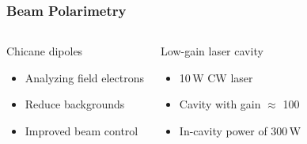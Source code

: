 \begin{frame}[t]
 \frametitle{Beam Polarimetry}
 \begin{columns}[T]
  \begin{block}{Chicane dipoles}
   \begin{itemize}
    \item \alert{Analyzing field electrons}
    \item Reduce backgrounds
    \item Improved beam control
   \end{itemize}
   \begin{center}
   \end{center}
  \end{block}
  \begin{block}{Low-gain laser cavity}
   \begin{center}
   \end{center}
   \begin{itemize}
    \item 10\,W  CW laser
    \item Cavity with gain $\approx$ 100
    \item In-cavity power of 300\,W
   \end{itemize}
  \end{block}
 \end{columns}
\end{frame}
